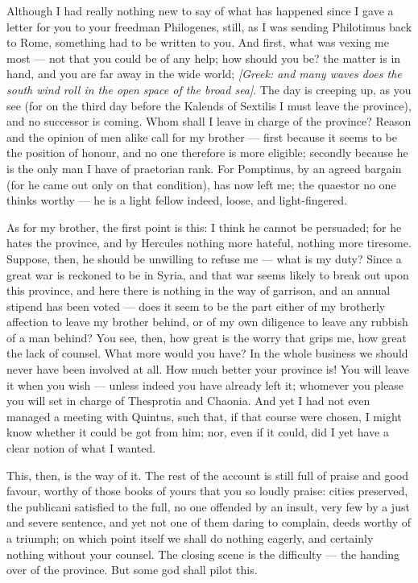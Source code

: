 

 Although I had really nothing new to say of what has happened since I gave a letter for you to your freedman Philogenes, still, as I was sending Philotimus back to Rome, something had to be written to you. And first, what was vexing me most --- not that you could be of any help; how should you be? the matter is in hand, and you are far away in the wide world; \textit{[Greek: and many waves does the south wind roll in the open space of the broad sea]}. The day is creeping up, as you see (for on the third day before the Kalends of Sextilis I must leave the province), and no successor is coming. Whom shall I leave in charge of the province? Reason and the opinion of men alike call for my brother --- first because it seems to be the position of honour, and no one therefore is more eligible; secondly because he is the only man I have of praetorian rank. For Pomptinus, by an agreed bargain (for he came out only on that condition), has now left me; the quaestor no one thinks worthy --- he is a light fellow indeed, loose, and light-fingered.

 As for my brother, the first point is this: I think he cannot be persuaded; for he hates the province, and by Hercules nothing more hateful, nothing more tiresome. Suppose, then, he should be unwilling to refuse me --- what is my duty? Since a great war is reckoned to be in Syria, and that war seems likely to break out upon this province, and here there is nothing in the way of garrison, and an annual stipend has been voted --- does it seem to be the part either of my brotherly affection to leave my brother behind, or of my own diligence to leave any rubbish of a man behind? You see, then, how great is the worry that grips me, how great the lack of counsel. What more would you have? In the whole business we should never have been involved at all. How much better your province is! You will leave it when you wish --- unless indeed you have already left it; whomever you please you will set in charge of Thesprotia and Chaonia. And yet I had not even managed a meeting with Quintus, such that, if that course were chosen, I might know whether it could be got from him; nor, even if it could, did I yet have a clear notion of what I wanted.

 This, then, is the way of it. The rest of the account is still full of praise and good favour, worthy of those books of yours that you so loudly praise: cities preserved, the publicani satisfied to the full, no one offended by an insult, very few by a just and severe sentence, and yet not one of them daring to complain, deeds worthy of a triumph; on which point itself we shall do nothing eagerly, and certainly nothing without your counsel. The closing scene is the difficulty --- the handing over of the province. But some god shall pilot this.

